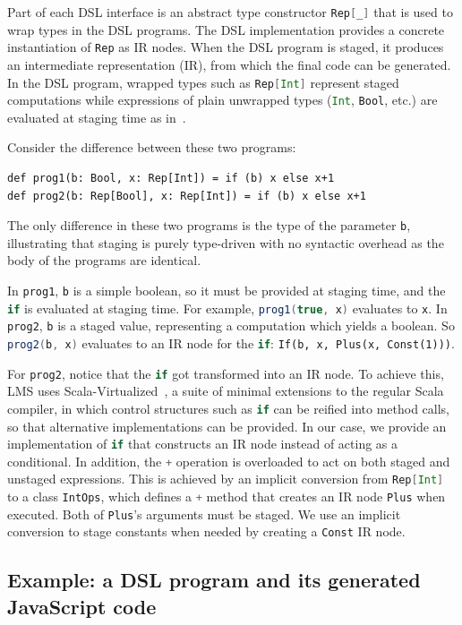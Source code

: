 \documentclass{llncs}
\newcommand{\code}[1]{\lstinline[language=Scala,columns=fixed,basicstyle=\footnotesize]|#1|}
\begin{document}
Part of each DSL interface is an abstract type constructor
\code{Rep[_]} that is used to wrap types in the DSL programs. The DSL
implementation provides a concrete instantiation of \code{Rep} as IR
nodes. When the DSL program is staged, it produces an intermediate
representation (IR), from which the final code can be generated. In
the DSL program, wrapped types such as \code{Rep[Int]} represent
staged computations while expressions of plain unwrapped types
(\code{Int}, \code{Bool}, etc.) are evaluated at staging time as
in~\cite{finally-tagless,polymorphic-embedding}.

Consider the difference between these two programs:
\begin{lstlisting}
def prog1(b: Bool, x: Rep[Int]) = if (b) x else x+1
def prog2(b: Rep[Bool], x: Rep[Int]) = if (b) x else x+1
\end{lstlisting}

The only difference in these two programs is the type of the parameter
\code{b}, illustrating that staging is purely type-driven with no
syntactic overhead as the body of the programs are identical.

In \code{prog1}, \code{b} is a simple boolean, so it must be provided
at staging time, and the \code{if} is evaluated at staging time. For
example, \code{prog1(true, x)} evaluates to \code{x}. In \code{prog2},
\code{b} is a staged value, representing a computation which yields a
boolean. So \code{prog2(b, x)} evaluates to an IR node for the \code{if}:
{\tt\small If(b, x, Plus(x, Const(1)))}.

For \code{prog2}, notice that the \code{if} got transformed into an IR
node. To achieve this, LMS uses
Scala-Virtualized~\cite{scala-virtualized}, a suite of minimal
extensions to the regular Scala compiler, in which control
structures such as \code{if} can be reified into method calls, so that
alternative implementations can be provided. In our case, we provide an
implementation of \code{if} that constructs an IR node instead of
acting as a conditional. In addition, the \code{+} operation is
overloaded to act on both staged and unstaged expressions. This is
achieved by an implicit conversion from \code{Rep[Int]} to a class
\code{IntOps}, which defines a \code{+} method that creates an IR node
\code{Plus} when executed. Both of \code{Plus}'s arguments must be
staged. We use an implicit conversion to stage constants when needed
by creating a \code{Const} IR node.

\subsection{Example: a DSL program and its generated JavaScript code}
\end{document}
